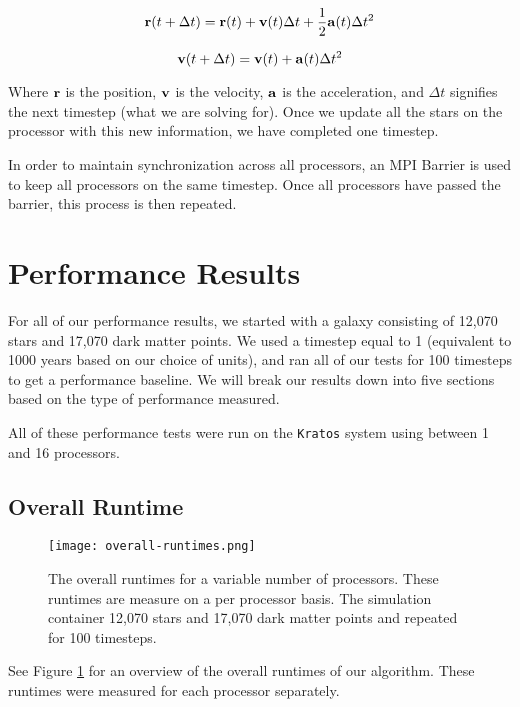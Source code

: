 \documentclass{article}
\begin{document}
\begin{equation}
{\bf r}(t + \Delta t) = {\bf r}(t) + {\bf v}(t) \Delta t + \frac{1}{2} {\bf a}(t) \Delta t^{2}
\end{equation}         

\begin{equation}
{\bf v}(t + \Delta t) = {\bf v}(t) + {\bf a}(t) \Delta t^{2}
\end{equation}                                                                         

Where ${\bf r}$ is the position, ${\bf v}$ is the velocity, ${\bf a}$ is the acceleration, and $\Delta t$ signifies the next timestep (what we are solving for).  Once we update all the stars on the processor with this new information, we have completed one timestep.  

In order to maintain synchronization across all processors, an MPI Barrier is used to keep all processors on the same timestep.  Once all processors have passed the barrier, this process is then repeated. 

\section{Performance Results}

For all of our performance results, we started with a galaxy consisting of 12,070 stars and 17,070 dark matter points.  We used a timestep equal to 1 (equivalent to 1000 years based on our choice of units), and ran all of our tests for 100 timesteps to get a performance baseline.  We will break our results down into five sections based on the type of performance measured.

All of these performance tests were run on the \texttt{Kratos} system using between 1 and 16 processors.  

\subsection{Overall Runtime}

\begin{figure}
\centering
\texttt{[image: overall-runtimes.png]}
\caption{The overall runtimes for a variable number of processors.  These runtimes are measure on a per processor basis.  The simulation container 12,070 stars and 17,070 dark matter points and repeated for 100 timesteps. \label{fig:overall-runtimes}}
\end{figure} 

See Figure \ref{fig:overall-runtimes} for an overview of the overall runtimes of our algorithm.  These runtimes were measured for each processor separately.
\end{document}

